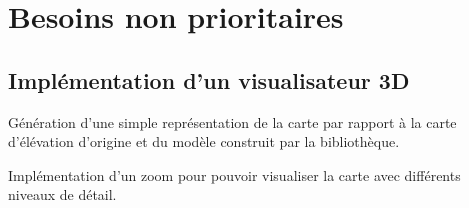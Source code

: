 \section{Besoins non prioritaires}

\subsection{Implémentation d'un visualisateur 3D}
Génération d'une simple représentation de la carte par rapport à la
carte d'élévation d'origine et du modèle construit par la bibliothèque.

Implémentation d'un zoom pour pouvoir visualiser la carte avec différents niveaux
de détail.
